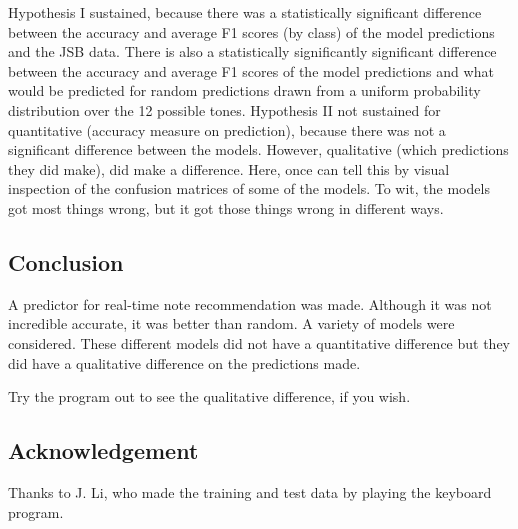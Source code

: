 \documentclass{article}
\begin{document}
Hypothesis I sustained, because there was a statistically significant difference between the accuracy and average F1 scores (by class) of the model predictions and the JSB data. There is also a statistically significantly significant difference between the accuracy and average F1 scores of the model predictions and what would be predicted for random predictions drawn from a uniform probability distribution over the 12 possible tones. %
Hypothesis II not sustained for quantitative (accuracy measure on prediction), because there was not a significant difference between the models. %
However, qualitative (which predictions they did make), did make a difference. Here, once can tell this by visual inspection of the confusion matrices of some of the models. To wit, the models got most things wrong, but it got those things wrong in different ways.

\subsection*{Conclusion}
A predictor for real-time note recommendation was made.
Although it was not incredible accurate, it was better than random.
A variety of models were considered.
These different models did not have a quantitative difference but they did have a qualitative difference on the predictions made.

Try the program out to see the qualitative difference, if you wish.

\subsection*{Acknowledgement}
Thanks to J. Li, who made the training and test data by playing the keyboard program.
\end{document}
